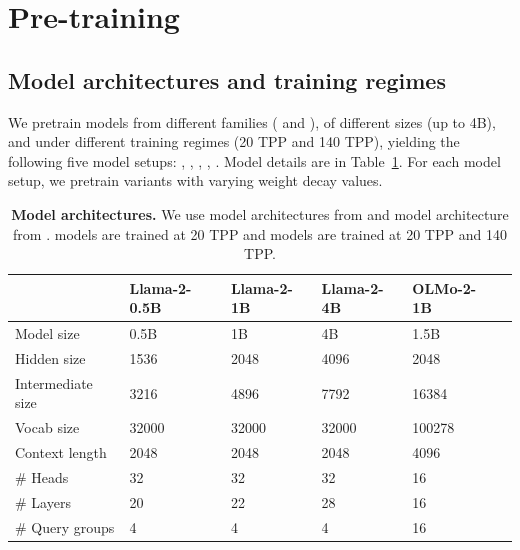 
\section{Pre-training} 
\label{app:pt}


\subsection{Model architectures and training regimes}
\label{app:pt-model-arch}

We pretrain models from different families (\llama{} and \olmo{}), of different sizes (up to 4B), and under different training regimes (20 TPP and 140 TPP), yielding the following five model setups: \llamazeropointfiveB{}, \llamaoneB{}, \llamafourB{}, \olmoonex{}, \olmosevenx{}. Model details are in Table~\ref{table:model-arch}. For each model setup, we pretrain variants with varying weight decay values.


\renewcommand{\arraystretch}{1.2} 
\begin{table}[H]
\centering
\begin{tabular}{llllll}
\hline
\textbf{} & \textbf{Llama-2-0.5B} & \textbf{Llama-2-1B} & \textbf{Llama-2-4B} & \textbf{OLMo-2-1B}  \\ \hline
Model size        & 0.5B     & 1B      & 4B       & 1.5B       \\
Hidden size       & 1536     & 2048    & 4096     & 2048      \\
Intermediate size & 3216     & 4896    & 7792     & 16384      \\
Vocab size        & 32000    & 32000   & 32000    & 100278    \\
Context length    & 2048     & 2048    & 2048     & 4096      \\
\# Heads          & 32       & 32      & 32       & 16        \\
\# Layers         & 20       & 22      & 28       & 16        \\
\# Query groups   & 4        & 4       & 4        & 16         \\ \hline
\end{tabular}
\vspace{0.2cm}
\caption{\textbf{Model architectures.} We use \llama{} model architectures from \citet{qi2025evolm} and \olmo{} model architecture from \citet{olmo2024olmo2}. \llama{} models are trained at 20 TPP and \olmo{} models are trained at 20 TPP and 140 TPP.}
\label{table:model-arch}
\end{table}


